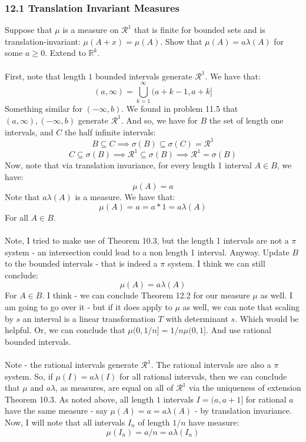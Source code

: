 \documentclass[12pt,a4paper]{article}
\newcommand{\1}[1]{\mathbbm{1}\left\{ #1 \right\}}
\newcommand{\R}{\mathbb{R}}
\newcommand{\rcal}{\mathcal{R}}
\begin{document}
\subsubsection{12.1 Translation Invariant Measures} Suppose that $\mu$ is a measure on $\rcal^1$ that is finite for bounded sets and is translation-invariant: $\mu(A + x) = \mu(A)$. Show that $\mu(A) = a\lambda(A)$ for some $a \geq 0$. Extend to $\R^k$.
\\\\
First, note that length $1$ bounded intervals generate $\rcal^1$. We have that:
$$
	(a,\infty) = \bigcup_{k=1}^\infty (a + k - 1, a + k]
$$
Something similar for $(-\infty,b)$. We found in problem 11.5 that $(a,\infty),(-\infty,b)$ generate $\rcal^1$. And so, we have for $B$ the set of length one intervals, and $C$ the half infinite intervals:
$$
	B \subseteq C \implies
	\sigma(B) \subseteq \sigma(C) = \rcal^1
$$
$$
	C \subseteq \sigma(B) \implies \rcal^1 \subseteq \sigma(B) \implies
	\rcal^1 = \sigma(B)
$$
Now, note that via translation invariance, for every length 1 interval $A \in B$, we have:
$$
	\mu(A) = a
$$
Note that $a\lambda(A)$ is a measure. We have that:
$$
	\mu(A) = a = a * 1 = a\lambda(A)
$$
For all $A \in B$.
\\\\
Note, I tried to make use of Theorem 10.3, but the length 1 intervals are not a $\pi$ system - an intersection could lead to a non length 1 interval. Anyway. Update $B$ to the bounded intervals - that is indeed a $\pi$ system. I think we can still conclude:
$$
	\mu(A) = a\lambda(A)
$$
For $A \in B$. I think - we can conclude Theorem 12.2 for our measure $\mu$ as well. I am going to go over it - but if it does apply to $\mu$ as well, we can note that scaling by $s$ an interval is a linear transformation $T$ with determinant $s$. Which would be helpful. Or, we can conclude that $\mu(0,1/n] = 1/n\mu(0,1]$. And use rational bounded intervals.
\\\\
Note - the rational intervals generate $\rcal^1$. The rational intervals are also a $\pi$ system. So, if $\mu(I) = a\lambda(I)$ for all rational intervals, then we can conclude that $\mu$ and $a\lambda$, as measures, are equal on all of $\rcal^1$ via the uniqueness of extension Theorem 10.3. As noted above, all length $1$ intervals $I = (a,a+1]$ for rational $a$ have the same measure - say $\mu(A) = a = a\lambda(A)$ - by translation invariance. Now, I will note that all intervals $I_n$ of length $1/n$ have measure:
$$
	\mu(I_n) = a/n = a \lambda(I_n)
$$
\end{document}
